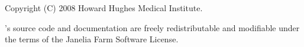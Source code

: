 \vspace*{\fill}
\begin{flushleft}
Copyright (C) 2008 Howard Hughes Medical Institute.

\vspace{2em} 

's source code and documentation are freely redistributable
and modifiable under the terms of the Janelia Farm Software License.
\end{flushleft}
